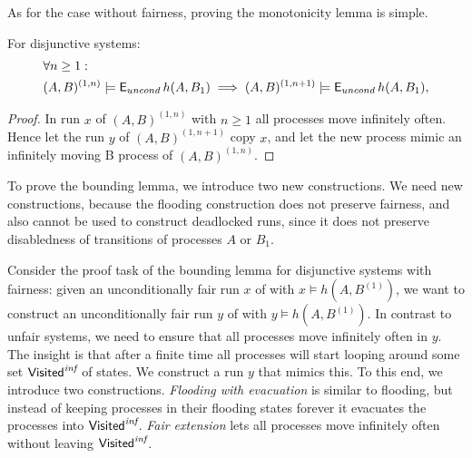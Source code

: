 As for the case without fairness, proving the monotonicity lemma is simple.

\begin{lemma} \label{disj:le:FairDisjunctiveMonotonicity}
For disjunctive systems:
\begin{align*}
& \forall n \geq 1: \\
&(A,B)^{(1, n)} \models \operatorname{\mathsf{E}}_{uncond} h(A,B_1) 
\implies
(A,B)^{(1,n+1)} \models \operatorname{\mathsf{E}}_{uncond} h(A,B_1),\\
\end{align*}
\end{lemma}
\begin{proof}
In run $x$ of $(A,B)^{(1,n)}$ with $n \geq 1$ all processes move infinitely often. 
Hence let the run $y$ of $(A,B)^{(1,n+1)}$ copy $x$, 
and let the new process mimic an infinitely moving B process of $(A,B)^{(1,n)}$.
\end{proof}

To prove the bounding lemma, we introduce two new constructions.
We need new constructions, because the flooding construction does not preserve fairness,
and also cannot be used to construct deadlocked runs,
since it does not preserve disabledness of transitions of processes $A$ or $B_1$.

Consider the proof task of the bounding lemma for disjunctive systems with fairness:
given an unconditionally fair run $x$ of 
\largesys with 
$x \models h(A,B^{(1)})$, we want to construct an unconditionally fair run $y$ 
of \cutoffsys with $y \models h(A,B^{(1)})$. In contrast to unfair systems, we 
need to ensure that all processes move infinitely often in $y$. 
The insight is 
that after a finite time all processes will start looping 
around some set $\mathsf{Visited}^{\textit{inf}}$ of states. We construct a run $y$ that
mimics this. To this end, we introduce two constructions. \emph{Flooding with
evacuation} is similar to flooding, but instead of keeping
processes in their flooding states forever it evacuates the processes into 
$\mathsf{Visited}^{\textit{inf}}$. \emph{Fair extension} lets all processes move infinitely 
often without leaving $\mathsf{Visited}^{\textit{inf}}$.

